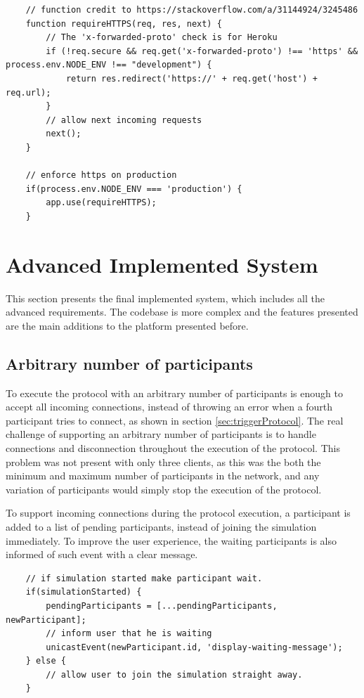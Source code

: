 \begin{lstlisting}
    // function credit to https://stackoverflow.com/a/31144924/3245486
    function requireHTTPS(req, res, next) {
        // The 'x-forwarded-proto' check is for Heroku
        if (!req.secure && req.get('x-forwarded-proto') !== 'https' && process.env.NODE_ENV !== "development") {
            return res.redirect('https://' + req.get('host') + req.url);
        }
        // allow next incoming requests
        next();
    }
    
    // enforce https on production
    if(process.env.NODE_ENV === 'production') {
        app.use(requireHTTPS);
    }
\end{lstlisting}


\section{Advanced Implemented System}
This section presents the final implemented system, which includes all the advanced requirements. The codebase is more complex and the features presented are the main additions to the platform presented before.


\subsection{Arbitrary number of participants}
To execute the protocol with an arbitrary number of participants is enough to accept all incoming connections, instead of throwing an error when a fourth participant tries to connect, as shown in section \ref{sec:triggerProtocol}. The real challenge of supporting an arbitrary number of participants is to handle connections and disconnection throughout the execution of the protocol. This problem was not present with only three clients, as this was the both the minimum and maximum number of participants in the network, and any variation of participants would simply stop the execution of the protocol. \newline

To support incoming connections during the protocol execution, a participant is added to a list of pending participants, instead of joining the simulation immediately. To improve the user experience, the waiting participants is also informed of such event with a clear message.

\begin{lstlisting}
    // if simulation started make participant wait.
    if(simulationStarted) {
        pendingParticipants = [...pendingParticipants, newParticipant];
        // inform user that he is waiting 
        unicastEvent(newParticipant.id, 'display-waiting-message');
    } else {
        // allow user to join the simulation straight away.
    }
\end{lstlisting}

